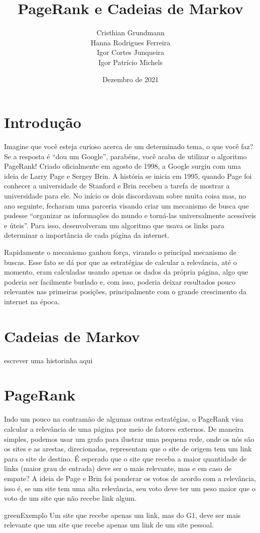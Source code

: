\documentclass{article}
\title{PageRank e Cadeias de Markov}
\author{Cristhian Grundmann \\
Hanna Rodrigues Ferreira \\
Igor Cortes Junqueira \\
Igor Patrício Michels}
\date{Dezembro de 2021}
\begin{document}
\maketitle

\section*{Introdução}

Imagine que você esteja curioso acerca de um determinado tema, o que você faz? Se a resposta é ``dou um Google'', parabéns, você acaba de utilizar o algoritmo PageRank! Criado oficialmente em agosto de 1998, a Google surgiu com uma ideia de Larry Page e Sergey Brin. A história se inicia em 1995, quando Page foi conhecer a universidade de Stanford e Brin recebeu a tarefa de mostrar a universidade para ele. No início os dois discordavam sobre muita coisa mas, no ano seguinte, fecharam uma parceria visando criar um mecanismo de busca que pudesse ``organizar as informações do mundo e torná-las universalmente acessíveis e úteis''. Para isso, desenvolveram um algoritmo que usava os links para determinar a importância de cada página da internet.\cite{google}

Rapidamente o mecanismo ganhou força, virando o principal mecanismo de buscas. Esse fato se dá por que as estratégias de calcular a relevância, até o momento, eram calculadas usando apenas os dados da própria página, algo que poderia ser facilmente burlado e, com isso, poderia deixar resultados pouco relevantes nas primeiras posições, principalmente com o grande crescimento da internet na época.

\section*{Cadeias de Markov}

escrever uma historinha aqui

\section*{PageRank}

Indo um pouco na contramão de algumas outras estratégias, o PageRank visa calcular a relevância de uma página por meio de fatores externos. De maneira simples, podemos usar um grafo para ilustrar uma pequena rede, onde os nós são os sites e as arestas, direcionadas, representam que o site de origem tem um link para o site de destino. É esperado que o site que receba a maior quantidade de links (maior grau de entrada) deve ser o mais relevante, mas e em caso de empate? A ideia de Page e Brin foi ponderar os votos de acordo com a relevância, isso é, se um site tem uma alta relevância, seu voto deve ter um peso maior que o voto de um site que não recebe link algum.
\begin{mybox}{green}{Exemplo}
    Um site que recebe apenas um link, mas do G1, deve ser mais relevante que um site que recebe apenas um link de um site pessoal.
\end{mybox}
\end{document}

